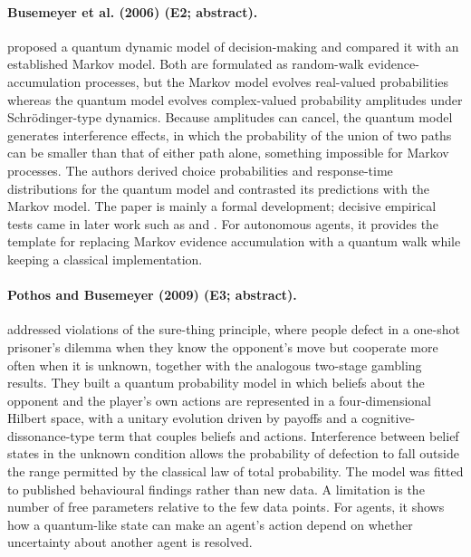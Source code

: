 \documentclass[10pt,a4paper]{article}
\begin{document}
\paragraph{Busemeyer et al. (2006) (E2; abstract).} \citet{Busemeyer2006} proposed a quantum dynamic model of decision-making and compared it with an established Markov model. Both are formulated as random-walk evidence-accumulation processes, but the Markov model evolves real-valued probabilities whereas the quantum model evolves complex-valued probability amplitudes under Schrödinger-type dynamics. Because amplitudes can cancel, the quantum model generates interference effects, in which the probability of the union of two paths can be smaller than that of either path alone, something impossible for Markov processes. The authors derived choice probabilities and response-time distributions for the quantum model and contrasted its predictions with the Markov model. The paper is mainly a formal development; decisive empirical tests came in later work such as \citep{Busemeyer2009} and \citep{Kvam2015}. For autonomous agents, it provides the template for replacing Markov evidence accumulation with a quantum walk while keeping a classical implementation.

\paragraph{Pothos and Busemeyer (2009) (E3; abstract).} \citet{Pothos2009} addressed violations of the sure-thing principle, where people defect in a one-shot prisoner's dilemma when they know the opponent's move but cooperate more often when it is unknown, together with the analogous two-stage gambling results. They built a quantum probability model in which beliefs about the opponent and the player's own actions are represented in a four-dimensional Hilbert space, with a unitary evolution driven by payoffs and a cognitive-dissonance-type term that couples beliefs and actions. Interference between belief states in the unknown condition allows the probability of defection to fall outside the range permitted by the classical law of total probability. The model was fitted to published behavioural findings rather than new data. A limitation is the number of free parameters relative to the few data points. For agents, it shows how a quantum-like state can make an agent's action depend on whether uncertainty about another agent is resolved.
\end{document}
